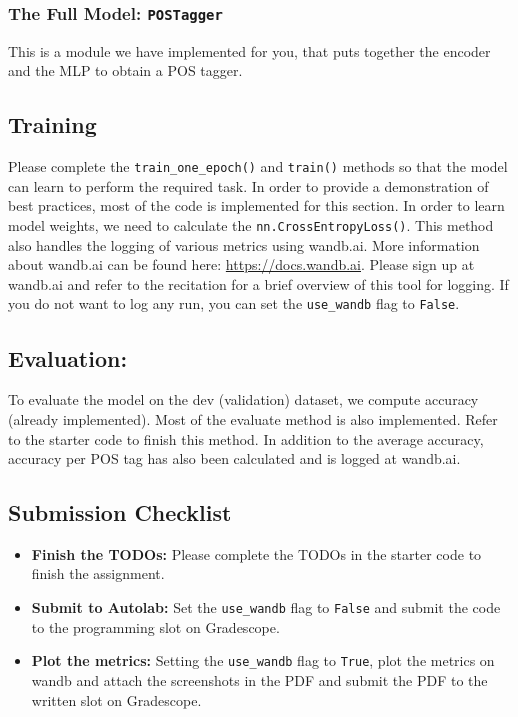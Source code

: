 \documentclass[11pt,addpoints,answers]{exam}
\begin{document}
\subsubsection{The Full Model: \lstinline{POSTagger}}
This is a module we have implemented for you, that puts together the encoder and the MLP to obtain a POS tagger.

\subsection{Training}
Please complete the \lstinline{train_one_epoch()} and \lstinline{train()} methods so that the model can learn to perform the required task. In order to provide a demonstration of best practices, most of the code is implemented for this section. In order to learn model weights, we need to calculate the \lstinline{nn.CrossEntropyLoss()}. This method also handles the logging of various metrics using wandb.ai. More information about wandb.ai can be found here: \url{https://docs.wandb.ai}. Please sign up at wandb.ai and refer to the recitation for a brief overview of this tool for logging. If you do not want to log any run, you can set the \lstinline{use_wandb} flag to \lstinline{False}.

\subsection{Evaluation:}
To evaluate the model on the dev (validation) dataset, we compute accuracy (already implemented). Most of the evaluate method is also implemented. Refer to the starter code to finish this method. In addition to the average accuracy, accuracy per POS tag has also been calculated and is logged at wandb.ai. 

\subsection{Submission Checklist}
\begin{itemize}
    \item \textbf{Finish the TODOs:} 
    Please complete the TODOs in the starter code to finish the assignment. 
    \item \textbf{Submit to Autolab:} 
    Set the \lstinline{use_wandb} flag to \lstinline{False} and submit the code to the programming slot on Gradescope.
    \item \textbf{Plot the metrics:} 
    Setting the \lstinline{use_wandb} flag to \lstinline{True}, plot the metrics on wandb and attach the screenshots in the PDF and submit the PDF to the written slot on Gradescope.
\end{itemize}


\clearpage
\end{document}
